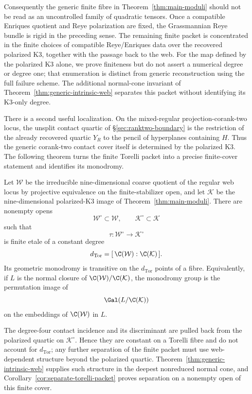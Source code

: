 Consequently the generic finite fibre in
Theorem~\ref{thm:main-moduli} should not be read as an uncontrolled
family of quadratic tensors.  Once a compatible Enriques quotient and
Reye polarization are fixed, the Grassmannian Reye bundle is rigid in
the preceding sense.  The remaining finite packet is concentrated in
the finite choices of compatible Reye/Enriques data over the recovered
polarized K3, together with the passage back to the web.  For the map defined by the polarized K3 alone, we prove finiteness
but do not assert a numerical degree or degree one; that enumeration
is distinct from generic reconstruction using the full failure
scheme.  The additional normal-cone invariant of
Theorem~\ref{thm:generic-intrinsic-web} separates this packet
without identifying its K3-only degree.

There is a second useful localization.  On the mixed-regular
projection-corank-two locus, the unsplit contact quartic of
\S\ref{sec:ranktwo-boundary} is the restriction of the already
recovered quartic $Y_R$ to the pencil of hyperplanes containing $H$.
Thus the generic corank-two contact cover itself is determined by the
polarized K3.  The following theorem turns the finite Torelli packet
into a precise finite-cover statement and identifies its monodromy.


\begin{theorem}
\label{thm:torelli-monodromy}
Let \(\mathcal W\) be the irreducible nine-dimensional coarse
quotient of the regular web locus by projective equivalence on the
finite-stabilizer open, and let \(\mathcal K\) be the
nine-dimensional polarized-K3 image of
Theorem~\ref{thm:main-moduli}.  There are nonempty opens
\[
 \mathcal W^\circ\subset\mathcal W,\qquad
 \mathcal K^\circ\subset\mathcal K
\]
such that
\[
 \tau:\mathcal W^\circ\longrightarrow\mathcal K^\circ
\]
is finite etale of a constant degree
\[
 d_{\mathrm{Tor}}
 =
 [\,\C(\mathcal W):\C(\mathcal K)\,].
\]
Its geometric monodromy is transitive on the \(d_{\mathrm{Tor}}\)
points of a fibre.  Equivalently, if \(L\) is the normal closure of
\(\C(\mathcal W)/\C(\mathcal K)\), the monodromy group is the
permutation image of
\[
 \Gal(L/\C(\mathcal K))
\]
on the embeddings of \(\C(\mathcal W)\) in \(L\).

The degree-four contact incidence and its discriminant are pulled back
from the polarized quartic on \(\mathcal K^\circ\).  Hence they are
constant on a Torelli fibre and do not account for
\(d_{\mathrm{Tor}}\); any further separation of the finite packet
must use web-dependent structure beyond the polarized quartic.
Theorem~\ref{thm:generic-intrinsic-web} supplies such structure in
the deepest nonreduced normal cone, and
Corollary~\ref{cor:separate-torelli-packet} proves separation on a
nonempty open of this finite cover.
\end{theorem}

